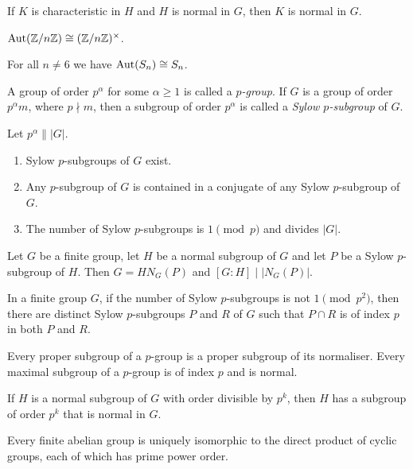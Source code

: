 \begin{prop}
    If $K$ is characteristic in $H$ and $H$ is normal in $G$, then $K$ is normal
    in $G$.
\end{prop}
\begin{prop}
    $\mathrm{Aut}(\mathbb{Z}/n\mathbb{Z})\cong(\mathbb{Z}/n\mathbb{Z})^\times$.
\end{prop}
\begin{prop}
    For all $n\ne 6$ we have $\mathrm{Aut}(S_n)\cong S_n$. 
\end{prop}
\begin{defn}
    A group of order $p^\alpha$ for some $\alpha\ge 1$ is called a
    \emph{$p$-group}. If $G$ is a group of order $p^\alpha m$, where $p\nmid m$,
    then a subgroup of order $p^\alpha$ is called a \emph{Sylow $p$-subgroup} of
    $G$.
\end{defn}
\begin{thm}[Sylow]
    Let $p^\alpha\||G|$.
    \begin{enumerate}
        \item Sylow $p$-subgroups of $G$ exist.
        \item Any $p$-subgroup of $G$ is contained in a conjugate of any Sylow
            $p$-subgroup of $G$.
        \item The number of Sylow $p$-subgroups is $1\pmod p$ and divides $|G|$.
    \end{enumerate}
\end{thm}
\begin{prop}
    Let $G$ be a finite group, let $H$ be a normal subgroup of $G$ and let $P$
    be a Sylow $p$-subgroup of $H$. Then $G=HN_G(P)$ and $[G:H]\mid |N_G(P)|$.
\end{prop}
\begin{prop}
    In a finite group $G$, if the number of Sylow $p$-subgroups is not
    $1\pmod{p^2}$, then there are distinct Sylow $p$-subgroups $P$ and $R$ of
    $G$ such that $P\cap R$ is of index $p$ in both $P$ and $R$.
\end{prop}
\begin{prop}
    Every proper subgroup of a $p$-group is a proper subgroup of its normaliser.
    Every maximal subgroup of a $p$-group is of index $p$ and is normal.
\end{prop}
\begin{cor}
    If $H$ is a normal subgroup of $G$ with order divisible by $p^k$, then $H$
    has a subgroup of order $p^k$ that is normal in $G$.
\end{cor}
\begin{thm}
    Every finite abelian group is uniquely isomorphic to the direct
    product of cyclic groups, each of which has prime power order.
\end{thm}
